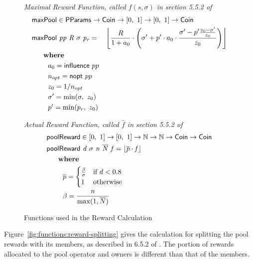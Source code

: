 \begin{figure}[htb]
  \emph{Maximal Reward Function, called $f(s,\sigma)$ in section 5.5.2 of~\cite{delegation_design}}
  \begin{align*}
      & \fun{maxPool} \in \PParams \to \Coin \to \unitInterval \to \unitInterval \to \Coin \\
      & \fun{maxPool}~\var{pp}~\var{R}~\sigma~\var{p_r} =
          ~~~\floor*{
             \frac{R}{1 + a_0}
             \cdot
             \left(
               \sigma' + p'\cdot a_0\cdot\frac{\sigma' - p'\frac{z_0-\sigma'}{z_0}}{z_0}
             \right)} \\
      & ~~~\where \\
      & ~~~~~~~a_0 = \fun{influence}~pp \\
      & ~~~~~~~n_{opt} = \fun{nopt}~pp \\
      & ~~~~~~~z_0 = 1/n_{opt} \\
      & ~~~~~~~\sigma'=\min(\sigma,~z_0) \\
      & ~~~~~~~p'=\min(p_r,~z_0) \\
  \end{align*}

  \emph{Actual Reward Function, called $\hat{f}$ in section 5.5.2 of~\cite{delegation_design}}
  \begin{align*}
      & \fun{poolReward} \in \unitInterval \to \unitInterval \to \N \to \N \to \Coin \to \Coin \\
      & \poolReward{d}{\sigma}{n}{\overline{N}}{f} =
      \floor*{\overline{p}\cdot\var{f}}\\
      & ~~~\where \\
      & ~~~~~~~\overline{p} =
        \begin{cases}
          \frac{\beta}{\sigma} & \text{if } d < 0.8 \\
          1 & \text{otherwise}
        \end{cases} \\
      & ~~~~~~~\beta = \frac{n}{\max(1, \overline{N})} \\
  \end{align*}
  \caption{Functions used in the Reward Calculation}
  \label{fig:functions:rewards}
\end{figure}

\clearpage

Figure~\ref{fig:functions:reward-splitting} gives the calculation for
splitting the pool rewards with its members, as described in 6.5.2 of \cite{delegation_design}.
The portion of rewards allocated to the pool operator and owners is different
than that of the members.

